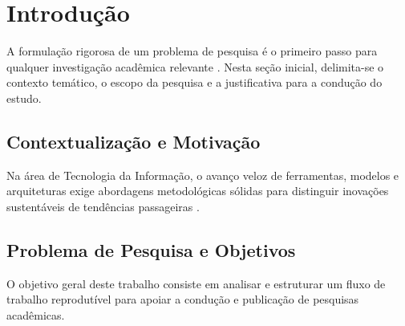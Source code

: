 \section{Introdução}
\label{sec:introducao}

A formulação rigorosa de um problema de pesquisa é o primeiro passo para qualquer investigação acadêmica relevante \cite{gil2022projetos, creswell2022research}. Nesta seção inicial, delimita-se o contexto temático, o escopo da pesquisa e a justificativa para a condução do estudo.

\subsection{Contextualização e Motivação}
Na área de Tecnologia da Informação, o avanço veloz de ferramentas, modelos e arquiteturas exige abordagens metodológicas sólidas para distinguir inovações sustentáveis de tendências passageiras \cite{oates2022researching}.

\subsection{Problema de Pesquisa e Objetivos}
O objetivo geral deste trabalho consiste em analisar e estruturar um fluxo de trabalho reprodutível para apoiar a condução e publicação de pesquisas acadêmicas.
